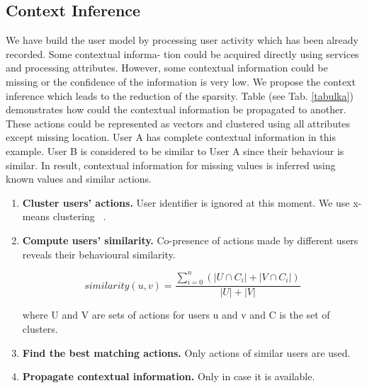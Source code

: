 \documentclass{acm_proc_article-sp}
\begin{document}
\subsection{Context Inference}
We have build the user model by processing user activity
which has been already recorded. Some contextual informa-
tion could be acquired directly using services and processing
attributes. However, some contextual information could be
missing or the confidence of the information is very low. We
propose the context inference which leads to the reduction
of the sparsity. Table (see Tab. \ref{tabulka}) demonstrates how could
the contextual information be propagated to another. These
actions could be represented as vectors and clustered using
all attributes except missing location. User A has complete
contextual information in this example. User B is considered
to be similar to User A since their behaviour is similar. In
result, contextual information for missing values is inferred
using known values and similar actions.


\begin{enumerate}
		\item \textbf{Cluster users' actions.} User identifier is ignored at
this moment. We use x-means clustering ~\cite{pelleg2000x}.
		\item \textbf{Compute users' similarity.} Co-presence of actions
made by different users reveals their behavioural similarity.

		$$ similarity(u,v) = \frac {\sum_{i=0}^{n} ( \left|U  \cap C_i\right|  + \left|V  \cap C_i\right| )} {\left|U\right| +  \left|V\right|}$$

where U and V are sets of actions for users u and v
and C is the set of clusters.
		\item \textbf{Find the best matching actions.} Only actions of
similar users are used.
		\item \textbf{Propagate contextual information.} Only in case
it is available.
\end{enumerate}

\end{document}
